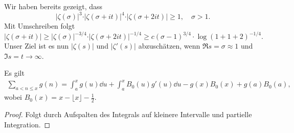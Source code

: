 \begin{remark}
    Wir haben bereits gezeigt, dass
    $$ \vert \zeta(\sigma) \vert^3 \cdot \vert \zeta(\sigma + it) \vert^4 \cdot \vert \zeta(\sigma + 2it) \vert \geq 1, \quad \sigma > 1. $$
    Mit Umschreiben folgt
    $$ \vert \zeta(\sigma + it) \vert \geq \vert \zeta(\sigma) \vert^{-3/4} \cdot \vert \zeta(\sigma + 2it) \vert^{-1/4} \geq c(\sigma - 1)^{3/4} \cdot \log(1+1+2)^{-1/4}. $$
    Unser Ziel ist es nun $\vert \zeta(s) \vert$ und $\vert \zeta'(s) \vert$ abzuschätzen, wenn $\Re s = \sigma \approx 1$ und $\Im s = t \to \infty$.
\end{remark}

\begin{theorem}
    Es gilt
    \begin{align*}
        \sum_{a < n \leq x} g(n) = \int_a^x g(u) \dd u + \int_a^x B_0(u) g'(u) \dd u - g(x) B_0(x) + g(a) B_0(a),
    \end{align*}
    wobei $B_0(x) = x - \lfloor x \rfloor - \frac{1}{2}$.
\end{theorem}

\begin{proof}
    Folgt durch Aufspalten des Integrals auf kleinere Intervalle und partielle Integration.
\end{proof}

